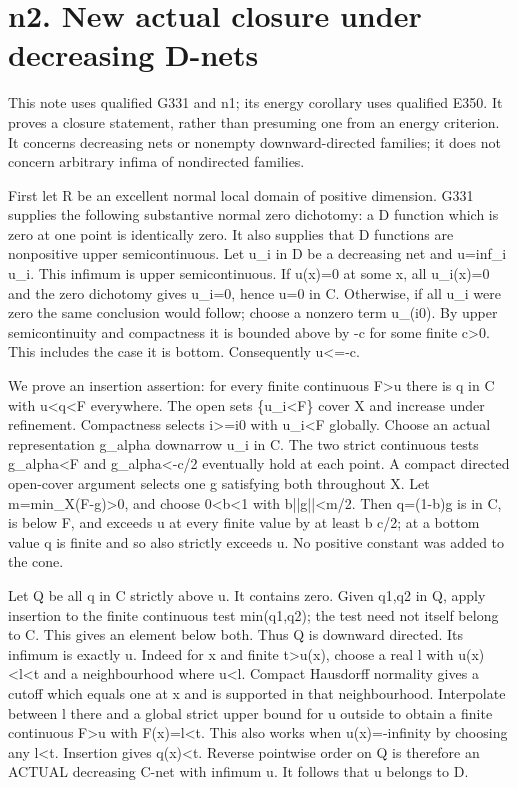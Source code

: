 \documentclass[11pt]{article}
\begin{document}
\section{n2. New actual closure under decreasing D-nets}

This note uses qualified G331 and n1; its energy corollary uses qualified E350. It proves a closure statement, rather than presuming one from an energy criterion. It concerns decreasing nets or nonempty downward-directed families; it does not concern arbitrary infima of nondirected families.

First let R be an excellent normal local domain of positive dimension. G331 supplies the following substantive normal zero dichotomy: a D function which is zero at one point is identically zero. It also supplies that D functions are nonpositive upper semicontinuous. Let u\_i in D be a decreasing net and u=inf\_i u\_i. This infimum is upper semicontinuous. If u(x)=0 at some x, all u\_i(x)=0 and the zero dichotomy gives u\_i=0, hence u=0 in C. Otherwise, if all u\_i were zero the same conclusion would follow; choose a nonzero term u\_(i0). By upper semicontinuity and compactness it is bounded above by -c for some finite c>0. This includes the case it is bottom. Consequently u<=-c.

We prove an insertion assertion: for every finite continuous F>u there is q in C with u<q<F everywhere. The open sets \{u\_i<F\} cover X and increase under refinement. Compactness selects i>=i0 with u\_i<F globally. Choose an actual representation g\_alpha downarrow u\_i in C. The two strict continuous tests g\_alpha<F and g\_alpha<-c/2 eventually hold at each point. A compact directed open-cover argument selects one g satisfying both throughout X. Let m=min\_X(F-g)>0, and choose 0<b<1 with b||g||<m/2. Then q=(1-b)g is in C, is below F, and exceeds u at every finite value by at least b c/2; at a bottom value q is finite and so also strictly exceeds u. No positive constant was added to the cone.

Let Q be all q in C strictly above u. It contains zero. Given q1,q2 in Q, apply insertion to the finite continuous test min(q1,q2); the test need not itself belong to C. This gives an element below both. Thus Q is downward directed. Its infimum is exactly u. Indeed for x and finite t>u(x), choose a real l with u(x)<l<t and a neighbourhood where u<l. Compact Hausdorff normality gives a cutoff which equals one at x and is supported in that neighbourhood. Interpolate between l there and a global strict upper bound for u outside to obtain a finite continuous F>u with F(x)=l<t. This also works when u(x)=-infinity by choosing any l<t. Insertion gives q(x)<t. Reverse pointwise order on Q is therefore an ACTUAL decreasing C-net with infimum u. It follows that u belongs to D.
\end{document}

